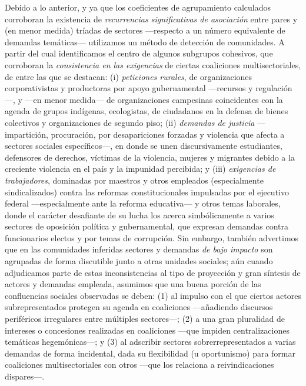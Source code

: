 \documentclass[letterpaper, 11pt]{book}
\theoremstyle{definition}
\theoremstyle{remark}
\begin{document}
Debido a lo anterior, y ya que los coeficientes de agrupamiento calculados corroboran la existencia de \emph{recurrencias significativas de asociación} entre pares y (en menor medida) tríadas de sectores ---respecto a un número equivalente de demandas temáticas--- utilizamos un método de detección de comunidades. 
A partir del cual identificamos el centro de algunos subgrupos cohesivos, que corroboran la \emph{consistencia en las exigencias} de ciertas coaliciones multisectoriales, de entre las que se destacan: 
(i) \emph{peticiones rurales}, de organizaciones corporativistas y productoras por apoyo gubernamental ---recursos y regulación---, y ---en menor medida--- de organizaciones campesinas coincidentes con la agenda de grupos indígenas, ecologistas, de ciudadanos en la defensa de bienes colectivos y organizaciones de segundo piso; 
(ii) \emph{demandas de justicia} ---impartición, procuración, por desapariciones forzadas y violencia que afecta a sectores sociales específicos---, en donde se unen discursivamente estudiantes, defensores de derechos, víctimas de la violencia, mujeres y migrantes debido a la creciente violencia en el país y la impunidad percibida; 
y (iii) \emph{exigencias de trabajadores}, dominadas por maestros y otros empleados (especialmente sindicalizados) contra las reformas constitucionales impulsadas por el ejecutivo federal ---especialmente ante la reforma educativa--- y otros temas laborales, donde el carácter desafiante de su lucha los acerca simbólicamente a varios sectores de oposición política y gubernamental, que expresan demandas contra funcionarios electos y por temas de corrupción. 
Sin embargo, también advertimos que en las comunidades inferidas sectores y demandas \emph{de bajo impacto} son agrupadas de forma discutible junto a otras unidades sociales; aún cuando adjudicamos parte de estas inconsistencias al tipo de proyección y gran síntesis de actores y demandas empleada, asumimos que una buena porción de las confluencias sociales observadas se deben: 
(1) al impulso con el que ciertos actores subrepresentados protegen su agenda en coaliciones ---añadiendo discursos periféricos irregulares entre múltiples sectores---; %
(2) a una gran pluralidad de intereses o concesiones realizadas en coaliciones ---que impiden centralizaciones temáticas hegemónicas---; %
y (3) al adscribir sectores sobrerrepresentados a varias demandas de forma incidental, dada su flexibilidad (u oportunismo) para formar coaliciones multisectoriales con otros ---que los relaciona a reivindicaciones dispares---. %
\end{document}
